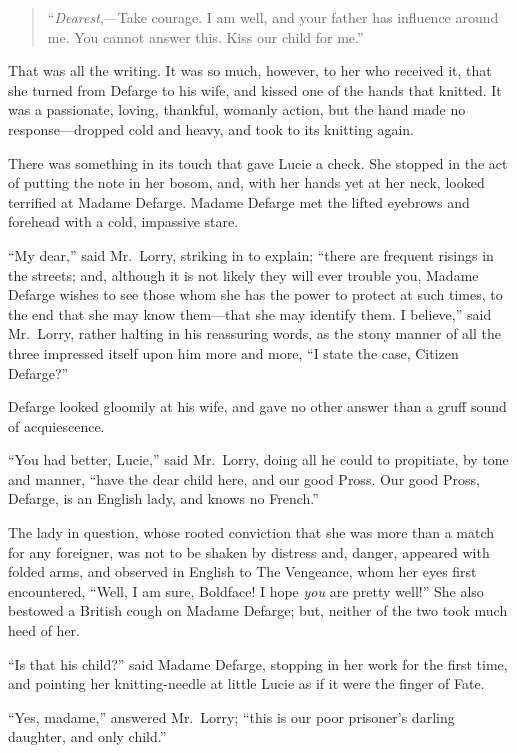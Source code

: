 \begin{quote}
     ``\emph{Dearest},---Take courage.  I am well, and your father has
      influence around me.  You cannot answer this.
      Kiss our child for me.''
\end{quote}

That was all the writing.  It was so much, however, to her who
received it, that she turned from Defarge to his wife, and kissed one
of the hands that knitted.  It was a passionate, loving, thankful,
womanly action, but the hand made no response---dropped cold and
heavy, and took to its knitting again.

There was something in its touch that gave Lucie a check.
She stopped in the act of putting the note in her bosom, and,
with her hands yet at her neck, looked terrified at Madame Defarge.
Madame Defarge met the lifted eyebrows and forehead with a cold,
impassive stare.

``My dear,'' said Mr.\ Lorry, striking in to explain; ``there are
frequent risings in the streets; and, although it is not likely they
will ever trouble you, Madame Defarge wishes to see those whom she
has the power to protect at such times, to the end that she may know
them---that she may identify them.  I believe,'' said Mr.\ Lorry,
rather halting in his reassuring words, as the stony manner of all
the three impressed itself upon him more and more, ``I state the case,
Citizen Defarge?''

Defarge looked gloomily at his wife, and gave no other answer than a
gruff sound of acquiescence.

``You had better, Lucie,'' said Mr.\ Lorry, doing all he could to
propitiate, by tone and manner, ``have the dear child here, and our
good Pross.  Our good Pross, Defarge, is an English lady, and knows
no French.''

The lady in question, whose rooted conviction that she was more than
a match for any foreigner, was not to be shaken by distress and,
danger, appeared with folded arms, and observed in English to The
Vengeance, whom her eyes first encountered, ``Well, I am sure, Boldface!
I hope \emph{you} are pretty well!''  She also bestowed a British cough on
Madame Defarge; but, neither of the two took much heed of her.

``Is that his child?'' said Madame Defarge, stopping in her work for
the first time, and pointing her knitting-needle at little Lucie as
if it were the finger of Fate.

``Yes, madame,'' answered Mr.\ Lorry; ``this is our poor prisoner's
darling daughter, and only child.''

